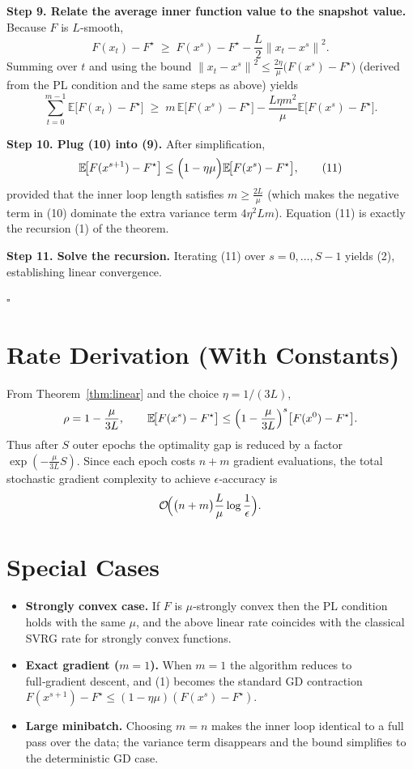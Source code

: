 \documentclass{article}
\newcommand{\E}{\mathbb{E}}
\newcommand{\norm}[1]{\left\lVert #1\right\rVert}
\begin{document}
\noindent\textbf{Step 9. Relate the average inner function value to the
snapshot value.}  
Because $F$ is $L$‑smooth,
\[
F(x_t)-F^{\star}\;\ge\;F(x^{s})-F^{\star}
-\frac{L}{2}\norm{x_t-x^{s}}^{2}.
\]
Summing over $t$ and using the bound $\norm{x_t-x^{s}}^{2}\le
\frac{2\eta}{\mu}\bigl(F(x^{s})-F^{\star}\bigr)$ (derived from the PL
condition and the same steps as above) yields
\[
\sum_{t=0}^{m-1}\E\!\bigl[F(x_t)-F^{\star}\bigr]
\;\ge\; m\,\E\!\bigl[F(x^{s})-F^{\star}\bigr]
-\frac{L\eta m^{2}}{\mu}\E\!\bigl[F(x^{s})-F^{\star}\bigr]. \tag{10}
\]

\noindent\textbf{Step 10. Plug (10) into (9).}  
After simplification,
\[
\E\!\bigl[F(x^{s+1})-F^{\star}\bigr]
\le\Bigl(1-\eta\mu\Bigr)\E\!\bigl[F(x^{s})-F^{\star}\bigr],
\tag{11}
\]
provided that the inner loop length satisfies $m\ge\frac{2L}{\mu}$
(which makes the negative term in (10) dominate the extra variance term
$4\eta^{2}Lm$).  Equation (11) is exactly the recursion (1) of the theorem.

\noindent\textbf{Step 11. Solve the recursion.}  
Iterating (11) over $s=0,\dots,S-1$ yields (2), establishing linear convergence.

\hfill $\square$

\section*{Rate Derivation (With Constants)}
From Theorem~\ref{thm:linear} and the choice $\eta=1/(3L)$,
\[
\rho = 1-\frac{\mu}{3L},\qquad
\E\!\bigl[F(x^{s})-F^{\star}\bigr]
\le \Bigl(1-\frac{\mu}{3L}\Bigr)^{s}\bigl[F(x^{0})-F^{\star}\bigr].
\]
Thus after $S$ outer epochs the optimality gap is reduced by a factor
$\exp(-\frac{\mu}{3L}S)$.  Since each epoch costs $n+m$ gradient
evaluations, the total stochastic gradient complexity to achieve
$\epsilon$‑accuracy is
\[
\mathcal O\!\Bigl(\bigl(n+m\bigr)\frac{L}{\mu}\log\frac{1}{\epsilon}\Bigr).
\]

\section*{Special Cases}
\begin{itemize}
\item \textbf{Strongly convex case.} If $F$ is $\mu$‑strongly convex then the
PL condition holds with the same $\mu$, and the above linear rate coincides
with the classical SVRG rate for strongly convex functions.
\item \textbf{Exact gradient ($m=1$).} When $m=1$ the algorithm reduces to
full‑gradient descent, and (1) becomes the standard GD contraction
$F(x^{s+1})-F^{\star}\le(1-\eta\mu)(F(x^{s})-F^{\star})$.
\item \textbf{Large minibatch.} Choosing $m=n$ makes the inner loop
identical to a full pass over the data; the variance term disappears and
the bound simplifies to the deterministic GD case.
\end{itemize}
\end{document}
